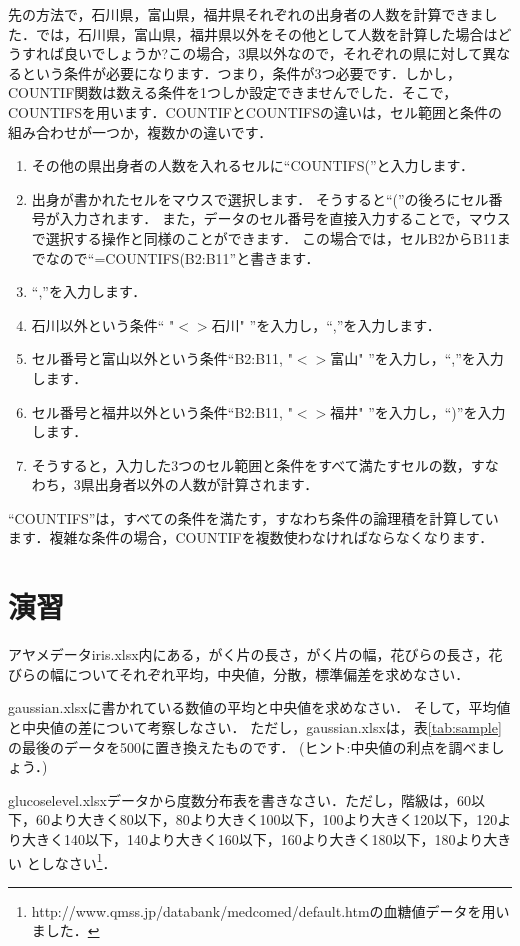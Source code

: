 \clearpage

先の方法で，石川県，富山県，福井県それぞれの出身者の人数を計算できました．では，石川県，富山県，福井県以外をその他として人数を計算した場合はどうすれば良いでしょうか?この場合，3県以外なので，それぞれの県に対して異なるという条件が必要になります．つまり，条件が3つ必要です．しかし，COUNTIF関数は数える条件を1つしか設定できませんでした．そこで，COUNTIFSを用います．COUNTIFとCOUNTIFSの違いは，セル範囲と条件の組み合わせが一つか，複数かの違いです．
\begin{enumerate}
    \item その他の県出身者の人数を入れるセルに``COUNTIFS(''と入力します．
    \item 出身が書かれたセルをマウスで選択します．
    そうすると``(''の後ろにセル番号が入力されます．
    また，データのセル番号を直接入力することで，マウスで選択する操作と同様のことができます．
    この場合では，セルB2からB11までなので``=COUNTIFS(B2:B11''と書きます．
    \item ``,''を入力します．
    \item 石川以外という条件`` "$<>$石川" ''を入力し，``,''を入力します．
    \item セル番号と富山以外という条件``B2:B11, "$<>$富山" ''を入力し，``,''を入力します．
    \item セル番号と福井以外という条件``B2:B11, "$<>$福井" ''を入力し，``)''を入力します．
    \item そうすると，入力した3つのセル範囲と条件をすべて満たすセルの数，すなわち，3県出身者以外の人数が計算されます．
\end{enumerate}
``COUNTIFS''は，すべての条件を満たす，すなわち条件の論理積を計算しています．複雑な条件の場合，COUNTIFを複数使わなければならなくなります．

\section{演習}

\practice
アヤメデータiris.xlsx内にある，がく片の長さ，がく片の幅，花びらの長さ，花びらの幅についてそれぞれ平均，中央値，分散，標準偏差を求めなさい．

\practice
gaussian.xlsxに書かれている数値の平均と中央値を求めなさい．
そして，平均値と中央値の差について考察しなさい．
ただし，gaussian.xlsxは，表\ref{tab:sample}の最後のデータを500に置き換えたものです．
(ヒント:中央値の利点を調べましょう．)

\practice
glucoselevel.xlsxデータから度数分布表を書きなさい．ただし，階級は，60以下，60より大きく80以下，80より大きく100以下，100より大きく120以下，120より大きく140以下，140より大きく160以下，160より大きく180以下，180より大きい としなさい\footnote{http://www.qmss.jp/databank/medcomed/default.htmの血糖値データを用いました．}．

